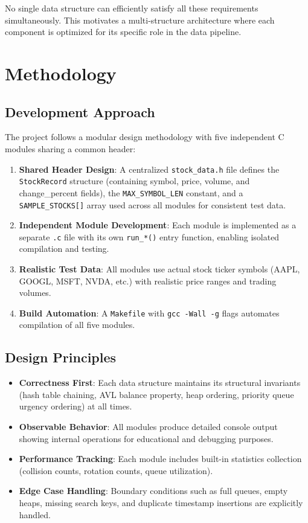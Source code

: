 \documentclass[conference]{IEEEtran}
\begin{document}
No single data structure can efficiently satisfy all these requirements simultaneously. This motivates a multi-structure architecture where each component is optimized for its specific role in the data pipeline.

\section{Methodology}

\subsection{Development Approach}

The project follows a modular design methodology with five independent C modules sharing a common header:

\begin{enumerate}
\item \textbf{Shared Header Design}: A centralized \texttt{stock\_data.h} file defines the \texttt{StockRecord} structure (containing symbol, price, volume, and change\_percent fields), the \texttt{MAX\_SYMBOL\_LEN} constant, and a \texttt{SAMPLE\_STOCKS[]} array used across all modules for consistent test data.
\item \textbf{Independent Module Development}: Each module is implemented as a separate \texttt{.c} file with its own \texttt{run\_*()} entry function, enabling isolated compilation and testing.
\item \textbf{Realistic Test Data}: All modules use actual stock ticker symbols (AAPL, GOOGL, MSFT, NVDA, etc.) with realistic price ranges and trading volumes.
\item \textbf{Build Automation}: A \texttt{Makefile} with \texttt{gcc -Wall -g} flags automates compilation of all five modules.
\end{enumerate}

\subsection{Design Principles}

\begin{itemize}
\item \textbf{Correctness First}: Each data structure maintains its structural invariants (hash table chaining, AVL balance property, heap ordering, priority queue urgency ordering) at all times.
\item \textbf{Observable Behavior}: All modules produce detailed console output showing internal operations for educational and debugging purposes.
\item \textbf{Performance Tracking}: Each module includes built-in statistics collection (collision counts, rotation counts, queue utilization).
\item \textbf{Edge Case Handling}: Boundary conditions such as full queues, empty heaps, missing search keys, and duplicate timestamp insertions are explicitly handled.
\end{itemize}
\end{document}

